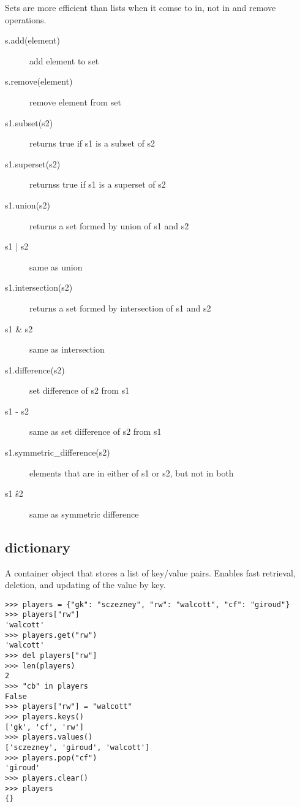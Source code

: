 \documentclass[a4paper, 12pt]{article}
\begin{document}
Sets are more efficient than lists when it comse to in, not in and remove operations.
\begin{description}
\item[s.add(element)] add element to set
\item[s.remove(element)] remove element from set
\item[s1.subset(s2)] returns true if s1 is a subset of s2
\item[s1.superset(s2)] returnss true if s1 is a superset of s2
\item[s1.union(s2)] returns a set formed by union of s1 and s2
\item[s1 | s2] same as union
\item[s1.intersection(s2)] returns a set formed by intersection of s1 and s2
\item[s1 \& s2] same as intersection
\item[s1.difference(s2)] set difference of s2 from s1
\item[s1 - s2] same as set difference of s2 from s1
\item[s1.symmetric\_difference(s2)] elements that are in either of s1 or s2, but not in both
\item[s1 \^ s2] same as symmetric difference
\end{description}

\subsection{dictionary}
A container object that stores a list of key/value pairs. Enables fast retrieval, deletion, and updating of the value by key.

\begin{verbatim}
>>> players = {"gk": "sczezney", "rw": "walcott", "cf": "giroud"}
>>> players["rw"]
'walcott'
>>> players.get("rw")
'walcott'
>>> del players["rw"]
>>> len(players)
2
>>> "cb" in players
False
>>> players["rw"] = "walcott"
>>> players.keys()
['gk', 'cf', 'rw']
>>> players.values()
['sczezney', 'giroud', 'walcott']
>>> players.pop("cf")
'giroud'
>>> players.clear()
>>> players
{}
\end{verbatim}

\end{document}
